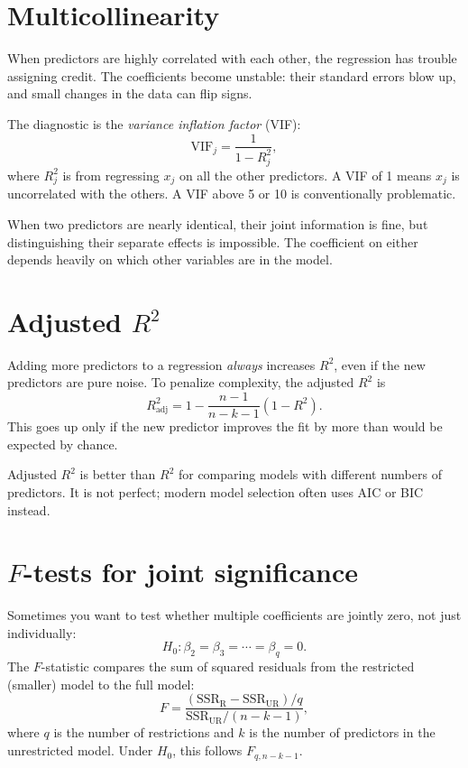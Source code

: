 \section{Multicollinearity}

When predictors are highly correlated with each other, the regression has trouble assigning credit. The coefficients become unstable: their standard errors blow up, and small changes in the data can flip signs.

The diagnostic is the \emph{variance inflation factor} (VIF):
\begin{equation}
  \text{VIF}_j = \frac{1}{1 - R_j^2},
  \label{eq:vif}
\end{equation}
where $R_j^2$ is from regressing $x_j$ on all the other predictors. A VIF of 1 means $x_j$ is uncorrelated with the others. A VIF above 5 or 10 is conventionally problematic.

When two predictors are nearly identical, their joint information is fine, but distinguishing their separate effects is impossible. The coefficient on either depends heavily on which other variables are in the model.

\section{Adjusted $R^2$}

Adding more predictors to a regression \emph{always} increases $R^2$, even if the new predictors are pure noise. To penalize complexity, the adjusted $R^2$ is
\begin{equation}
  R^2_{\text{adj}} = 1 - \frac{n-1}{n-k-1}(1 - R^2).
  \label{eq:adj-r2}
\end{equation}
This goes up only if the new predictor improves the fit by more than would be expected by chance.

Adjusted $R^2$ is better than $R^2$ for comparing models with different numbers of predictors. It is not perfect; modern model selection often uses AIC or BIC instead.

\section{$F$-tests for joint significance}

Sometimes you want to test whether multiple coefficients are jointly zero, not just individually:
\[
  H_0\colon \beta_2 = \beta_3 = \cdots = \beta_q = 0.
\]
The $F$-statistic compares the sum of squared residuals from the restricted (smaller) model to the full model:
\begin{equation}
  F = \frac{(\text{SSR}_{\text{R}} - \text{SSR}_{\text{UR}})/q}{\text{SSR}_{\text{UR}}/(n-k-1)},
  \label{eq:f-test}
\end{equation}
where $q$ is the number of restrictions and $k$ is the number of predictors in the unrestricted model. Under $H_0$, this follows $F_{q, n-k-1}$.

